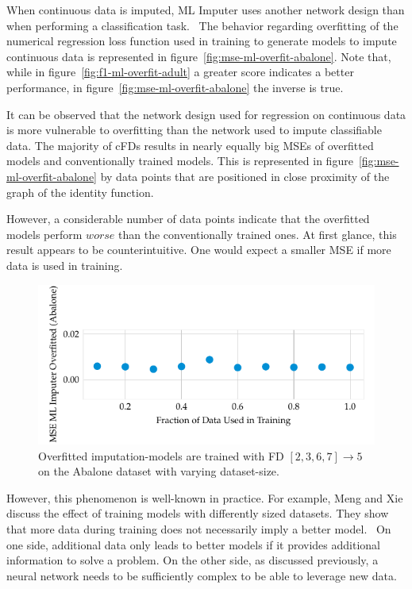 When continuous data is imputed, ML Imputer uses another network design than when performing a classification task.~\cite[p.~2025]{BIE18}
The behavior regarding overfitting of the numerical regression loss function used in training to generate models to impute continuous data is represented in figure~\ref{fig:mse-ml-overfit-abalone}.
Note that, while in figure~\ref{fig:f1-ml-overfit-adult} a greater score indicates a better performance, in figure~\ref{fig:mse-ml-overfit-abalone} the inverse is true.

It can be observed that the network design used for regression on continuous data is more vulnerable to overfitting than the network used to impute classifiable data.
The majority of cFDs results in nearly equally big MSEs of overfitted models and conventionally trained models.
This is represented in figure~\ref{fig:mse-ml-overfit-abalone} by data points that are positioned in close proximity of the graph of the identity function.

However, a considerable number of data points indicate that the overfitted models perform \( worse \) than the conventionally trained ones.
At first glance, this result appears to be counterintuitive.
One would expect a smaller MSE if more data is used in training.

\begin{figure}[ht]
     \centering
     \includegraphics[width=\textwidth]{../figures/abalone/mse-ml-overfitted-fractions.pdf}
     \caption{Overfitted imputation-models are trained with FD \( [2, 3, 6, 7] \rightarrow 5\) on the Abalone dataset with varying dataset-size.}
     \label{fig:mse-ml-overfit-fractions}
 \end{figure}

However, this phenomenon is well-known in practice.
For example, Meng and Xie discuss the effect of training models with differently sized datasets.
They show that more data during training does not necessarily imply a better model.~\cite[p.~1]{MEN14}
On one side, additional data only leads to better models if it provides additional information to solve a problem.
On the other side, as discussed previously, a neural network needs to be sufficiently complex to be able to leverage new data.

